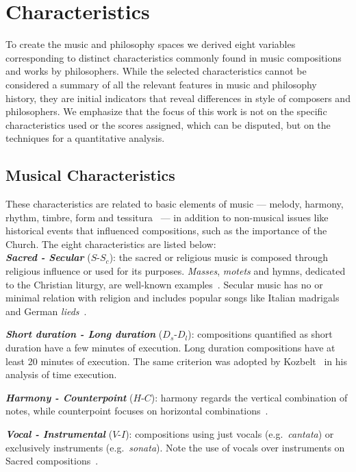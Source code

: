 \documentclass[
 aip,
 jmp,
 amsmath,amssymb,
 reprint,
]{revtex4-1}
\begin{document}
\section{Characteristics}

To create the music and philosophy spaces we derived eight variables
corresponding to distinct characteristics commonly found in music
compositions and works by philosophers. While the selected
characteristics cannot be considered a summary of all the relevant
features in music and philosophy history, they are initial indicators
that reveal differences in style of composers and philosophers. We
emphasize that the focus of this work is not on the specific
characteristics used or the scores assigned, which can be disputed,
but on the techniques for a quantitative analysis.

\subsection{Musical Characteristics}

These characteristics are related to basic elements of music ---
melody, harmony, rhythm, timbre, form and
tessitura~\cite{BennettHistory} --- in addition to non-musical issues
like historical events that influenced compositions, such as the
importance of the Church. The eight characteristics are listed
below:\\

{\bf \em{ Sacred - Secular}} ($S$-$S_c$): the sacred or religious
music is composed through religious influence or used for its
purposes. \textit{Masses}, \textit{motets} and hymns, dedicated to the
Christian liturgy, are well-known examples~\cite{Lovelock}. Secular
music has no or minimal relation with religion and includes popular
songs like Italian madrigals and German
\textit{lieds}~\cite{BennettHistory}.

{\bf \em{ Short duration - Long duration}} ($D_s$-$D_l$): compositions
quantified as short duration have a few minutes of execution. Long
duration compositions have at least 20 minutes of execution. The same
criterion was adopted by Kozbelt~\cite{Kozbelt01012009,
  Kozbelt01012007} in his analysis of time execution.

{\bf \em{ Harmony - Counterpoint}} ($H$-$C$): harmony regards the
vertical combination of notes, while counterpoint focuses on
horizontal combinations~\cite{BennettHistory}.

{\bf \em{ Vocal - Instrumental}} ($V$-$I$): compositions using just
vocals (e.g.\ \emph{cantata}) or exclusively instruments
(e.g.\ \emph{sonata}). Note the use of vocals over instruments on
Sacred compositions~\cite{Lovelock}.
\end{document}
